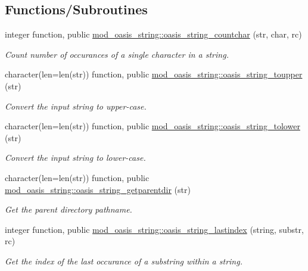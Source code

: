 \subsection*{Functions/\+Subroutines}
\begin{DoxyCompactItemize}
\item 
integer function, public \hyperlink{namespacemod__oasis__string_a54c5d197eba9bcb7fa7f71b200f8e5e6}{mod\+\_\+oasis\+\_\+string\+::oasis\+\_\+string\+\_\+countchar} (str, char, rc)
\begin{DoxyCompactList}\small\item\em Count number of occurances of a single character in a string. \end{DoxyCompactList}\item 
character(len=len(str)) function, public \hyperlink{namespacemod__oasis__string_a832ff1d26d766bee361ef9669efacda6}{mod\+\_\+oasis\+\_\+string\+::oasis\+\_\+string\+\_\+toupper} (str)
\begin{DoxyCompactList}\small\item\em Convert the input string to upper-\/case. \end{DoxyCompactList}\item 
character(len=len(str)) function, public \hyperlink{namespacemod__oasis__string_af339c54c982092a80960a5241ccae1fa}{mod\+\_\+oasis\+\_\+string\+::oasis\+\_\+string\+\_\+tolower} (str)
\begin{DoxyCompactList}\small\item\em Convert the input string to lower-\/case. \end{DoxyCompactList}\item 
character(len=len(str)) function, public \hyperlink{namespacemod__oasis__string_a8f2289f6a9d1e9940204bbeb82b89f33}{mod\+\_\+oasis\+\_\+string\+::oasis\+\_\+string\+\_\+getparentdir} (str)
\begin{DoxyCompactList}\small\item\em Get the parent directory pathname. \end{DoxyCompactList}\item 
integer function, public \hyperlink{namespacemod__oasis__string_afae0db32f2cf0b6beb00829f8f016e48}{mod\+\_\+oasis\+\_\+string\+::oasis\+\_\+string\+\_\+lastindex} (string, substr, rc)
\begin{DoxyCompactList}\small\item\em Get the index of the last occurance of a substring within a string. \end{DoxyCompactList}\item 

\end{DoxyCompactItemize}
